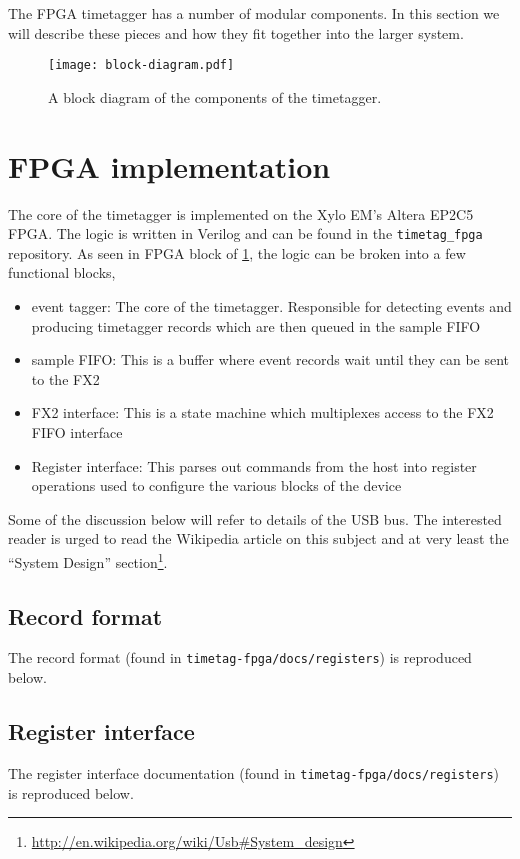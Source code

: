 The FPGA timetagger has a number of modular components. In this
section we will describe these pieces and how they fit together into
the larger system.

\begin{figure}
  \center
  \texttt{[image: block-diagram.pdf]}
  \caption{A block diagram of the components of the timetagger.}
  \label{Fig:BlockDiagram}
\end{figure}

\section{FPGA implementation}
The core of the timetagger is implemented on the Xylo EM's Altera
EP2C5 FPGA. The logic is written in Verilog and can be found in the
{\tt timetag\_fpga} repository. As seen in FPGA block of
\ref{Fig:BlockDiagram}, the logic can be broken into a few functional
blocks,

\begin{itemize}
  \item event tagger: The core of the timetagger. Responsible for
    detecting events and producing timetagger records which are then
    queued in the sample FIFO
  \item sample FIFO: This is a buffer where event records wait until
    they can be sent to the FX2
  \item FX2 interface: This is a state machine which multiplexes
    access to the FX2 FIFO interface
  \item Register interface: This parses out commands from the host
    into register operations used to configure the various blocks of
    the device
\end{itemize}

Some of the discussion below will refer to details of the USB bus. The
interested reader is urged to read the Wikipedia article on this
subject and at very least the ``System Design''
section\footnote{\url{http://en.wikipedia.org/wiki/Usb\#System\_design}}.

\subsection{Record format}
The record format (found in {\tt timetag-fpga/docs/registers}) is reproduced below.



\subsection{Register interface}
The register interface documentation (found in
{\tt timetag-fpga/docs/registers}) is reproduced below.

